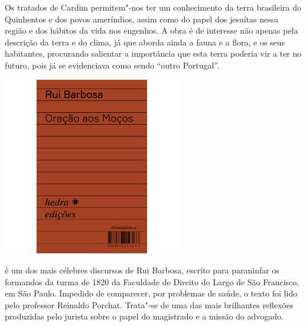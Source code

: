 Os tratados de Cardim permitem"-nos ter um conhecimento da terra brasileira do Quinhentos e dos povos ameríndios, assim como do papel dos jesuítas nessa região e dos hábitos da vida nos engenhos. A obra é de interesse não apenas pela descrição da terra e do clima, já que aborda ainda a fauna e a flora, e os seus habitantes, procurando salientar a importância que esta terra poderia vir a ter no futuro, pois já se evidenciava como sendo “outro Portugal”. 

\vfill

\hspace*{-.4cm}\begin{minipage}[c]{.5\linewidth}
\small{
{}}
\end{minipage}

\pagebreak

\begin{center}
\hspace*{.5cm}\includegraphics[width=78mm]{./grid/barbosa.jpg}
\end{center}

\hspace*{-7cm}\hrulefill\hspace*{-7cm}

\medskip

 é um dos mais célebres discursos de Rui
Barbosa, escrito para paraninfar os formandos da
turma de 1820 da Faculdade de Direito do Largo de São Francisco, em São
Paulo. Impedido de comparecer,  por problemas de saúde, o texto foi
lido pelo professor Reinaldo Porchat. Trata"-se de uma das mais
brilhantes reflexões produzidas pelo jurista sobre o papel do
magistrado e a missão do advogado.

